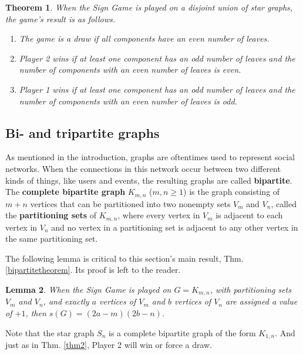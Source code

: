 \documentclass[amsart,11pt]{article}
\theoremstyle{dotless}
\theoremstyle{dotless}
\newtheorem{thm}{Theorem}[section]
\newtheorem{lem}[thm]{Lemma}
\begin{document}
\begin{thm} \label{thmstars}
When the Sign Game is played on a disjoint union of star graphs, the game's result is as follows.

\begin{enumerate}
    \item The game is a draw if all components have an even number of leaves.
    \item Player 2 wins if at least one component has an odd number of leaves and the number of components with an even number of leaves is even.
    \item Player 1 wins if at least one component has an odd number of leaves and the number of components with an even number of leaves is odd.

\end{enumerate}
\end{thm}

\subsection{Bi- and tripartite graphs}

As mentioned in the introduction, graphs are oftentimes used to represent social networks. When the connections in this network occur between two different kinds of things, like users and events, the resulting graphs are called \textbf{bipartite}.  The \textbf{complete bipartite graph} $K_{m,n}$ ($m,n \geq 1$) is the graph consisting of $m+n$ vertices that can be partitioned into two nonempty sets $V_m$ and $V_n$, called the \textbf{partitioning sets} of $K_{m,n}$, where every vertex in $V_m$ is adjacent to each vertex in $V_n$ and no vertex in a partitioning set is adjacent to any other vertex in the same partitioning set. 

The following lemma is critical to this section's main result, Thm. \ref{bipartitetheorem}. Its proof is left to the reader.

\begin{lem} \label{bipartitelemma}
 When the Sign Game is played on $G = K_{m,n}$, with partitioning sets $V_m$ and $V_n$, and exactly $a$ vertices of $V_m$ and $b$ vertices of $V_n$ are assigned a value of $+1$, then $s(G) = (2a-m)(2b-n)$.
\end{lem}

Note that the star graph $S_n$ is a complete bipartite graph of the form $K_{1,n}$. And just as in Thm. \ref{thm2}, Player 2 will win or force a draw.
\end{document}
